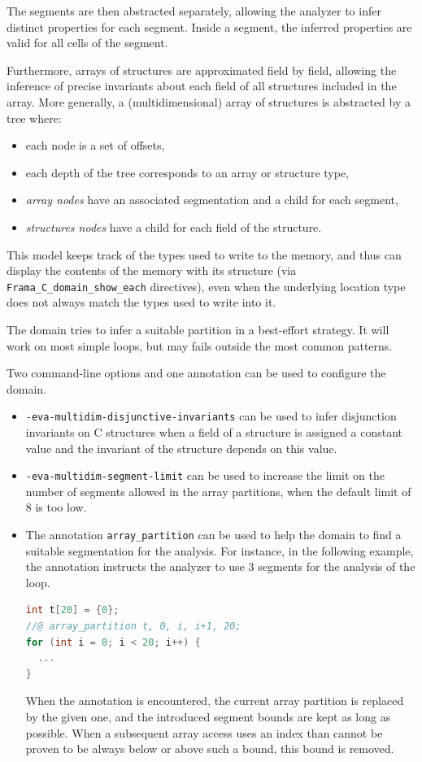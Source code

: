 \documentclass[web]{frama-c-book}
\begin{document}
The segments are then abstracted separately, allowing the analyzer to infer
distinct properties for each segment. Inside a segment, the inferred
properties are valid for all cells of the segment.

Furthermore, arrays of structures are approximated field by field, allowing the
inference of precise invariants about each field of all structures included in
the array. More generally, a (multidimensional) array of structures is
abstracted by a tree where:
\begin{itemize}
  \item each node is a set of offsets,
  \item each depth of the tree corresponds to an array or structure type,
  \item {\it array nodes} have an associated segmentation and a child for
        each segment,
  \item {\it structures nodes} have a child for each field of the structure.
\end{itemize}

This model keeps track of the types used to write to the memory, and thus
can display the contents of the memory with its structure (via
\lstinline|Frama_C_domain_show_each| directives), even when the underlying
location type does not always match the types used to write into it.

The domain tries to infer a suitable partition in a best-effort strategy. It
will work on most simple loops, but may fails outside the most common patterns.

Two command-line options and one annotation can be used to configure the
domain.
\begin{itemize}
  \item {\tt -eva-multidim-disjunctive-invariants} can be used to infer
        disjunction invariants on C structures when a field of a structure is
        assigned a constant value and the invariant of the structure depends on
        this value.
  \item {\tt -eva-multidim-segment-limit} can be used to increase the limit on
        the number of segments allowed in the array partitions, when the default
        limit of 8 is too low.
  \item The annotation {\tt array\_partition} can be used to help the domain
        to find a suitable segmentation for the analysis. For instance, in
        the following example, the annotation instructs the analyzer to use
        3 segments for the analysis of the loop.
\begin{lstlisting}[language=C]
int t[20] = {0};
//@ array_partition t, 0, i, i+1, 20;
for (int i = 0; i < 20; i++) {
  ...
}
\end{lstlisting}
        When the annotation is encountered, the current array partition is
        replaced by the given one, and the introduced segment bounds are kept
        as long as possible. When a subsequent array access uses an index than
        cannot be proven to be always below or above such a bound, this
        bound is removed.
\end{itemize}
\end{document}
